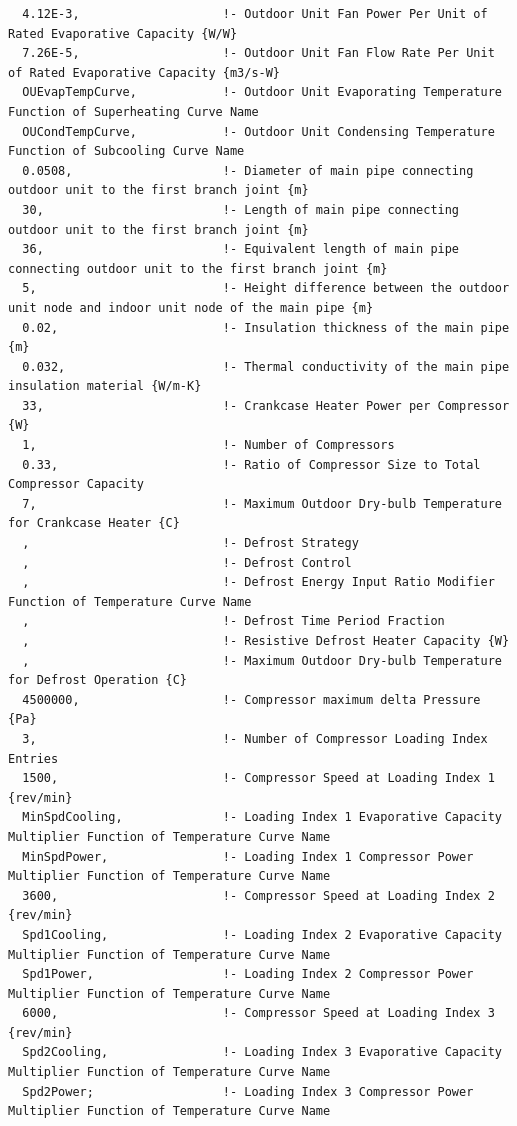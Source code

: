\begin{lstlisting}
  4.12E-3,                    !- Outdoor Unit Fan Power Per Unit of Rated Evaporative Capacity {W/W}
  7.26E-5,                    !- Outdoor Unit Fan Flow Rate Per Unit of Rated Evaporative Capacity {m3/s-W}
  OUEvapTempCurve,            !- Outdoor Unit Evaporating Temperature Function of Superheating Curve Name
  OUCondTempCurve,            !- Outdoor Unit Condensing Temperature Function of Subcooling Curve Name
  0.0508,                     !- Diameter of main pipe connecting outdoor unit to the first branch joint {m}
  30,                         !- Length of main pipe connecting outdoor unit to the first branch joint {m}
  36,                         !- Equivalent length of main pipe connecting outdoor unit to the first branch joint {m}
  5,                          !- Height difference between the outdoor unit node and indoor unit node of the main pipe {m}
  0.02,                       !- Insulation thickness of the main pipe {m}
  0.032,                      !- Thermal conductivity of the main pipe insulation material {W/m-K}
  33,                         !- Crankcase Heater Power per Compressor {W}
  1,                          !- Number of Compressors
  0.33,                       !- Ratio of Compressor Size to Total Compressor Capacity
  7,                          !- Maximum Outdoor Dry-bulb Temperature for Crankcase Heater {C}
  ,                           !- Defrost Strategy
  ,                           !- Defrost Control
  ,                           !- Defrost Energy Input Ratio Modifier Function of Temperature Curve Name
  ,                           !- Defrost Time Period Fraction
  ,                           !- Resistive Defrost Heater Capacity {W}
  ,                           !- Maximum Outdoor Dry-bulb Temperature for Defrost Operation {C}
  4500000,                    !- Compressor maximum delta Pressure {Pa}
  3,                          !- Number of Compressor Loading Index Entries
  1500,                       !- Compressor Speed at Loading Index 1 {rev/min}
  MinSpdCooling,              !- Loading Index 1 Evaporative Capacity Multiplier Function of Temperature Curve Name
  MinSpdPower,                !- Loading Index 1 Compressor Power Multiplier Function of Temperature Curve Name
  3600,                       !- Compressor Speed at Loading Index 2 {rev/min}
  Spd1Cooling,                !- Loading Index 2 Evaporative Capacity Multiplier Function of Temperature Curve Name
  Spd1Power,                  !- Loading Index 2 Compressor Power Multiplier Function of Temperature Curve Name
  6000,                       !- Compressor Speed at Loading Index 3 {rev/min}
  Spd2Cooling,                !- Loading Index 3 Evaporative Capacity Multiplier Function of Temperature Curve Name
  Spd2Power;                  !- Loading Index 3 Compressor Power Multiplier Function of Temperature Curve Name


\end{lstlisting}
